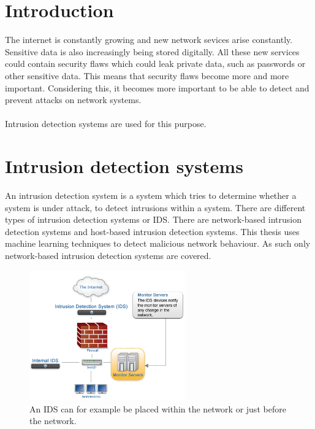 
\chapter{Introduction} %

\label{Chapter1} %

The internet is constantly growing and new network sevices arise constantly. Sensitive data is also increasingly being stored digitally. All these new services could contain security flaws which could leak private data, such as passwords or other sensitive data. This means that security flaws become more and more important. Considering this, it becomes more important to be able to detect and prevent attacks on network systems. \\\\
Intrusion detection systems are used for this purpose. 

\chapter{Intrusion detection systems} %

An intrusion detection system is a system which tries to determine whether a system is under attack, to detect intrusions within a system. There are different types of intrusion detection systems or IDS. There are network-based intrusion detection systems and host-based intrusion detection systems. This thesis uses machine learning techniques to detect malicious network behaviour. As such only network-based intrusion detection systems are covered.
\begin{figure}[H]
\centering
\includegraphics[width=0.6\textwidth]{Figures/idsdiagram}
\decoRule
\caption[Possible placement of IDS]{An IDS can for example be placed within the network or just before the network.}
\label{fig:IDS}
\end{figure}
